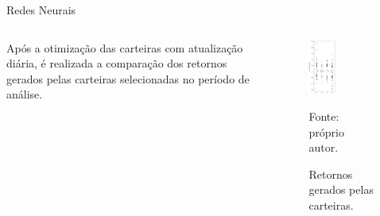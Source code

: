     \begin{frame}{Redes Neurais}
        
        \Large

        \begin{columns}
            \begin{column}{0.5\textwidth}

                Após a otimização das carteiras com atualização diária, é realizada a comparação dos retornos gerados pelas carteiras selecionadas no período de análise.

            \end{column}

            \begin{column}{0.5\textwidth}

                \begin{figure}[htbp]
                    \centering
                    \caption{Retornos gerados pelas carteiras.}
                    \label{fig:boxplot_inv}
                    \includegraphics[width=0.4\textwidth]{./images/boxplot_inv.png}
                    \par \footnotesize Fonte: próprio autor.
                \end{figure}

            \end{column}
        \end{columns}

    \end{frame}





